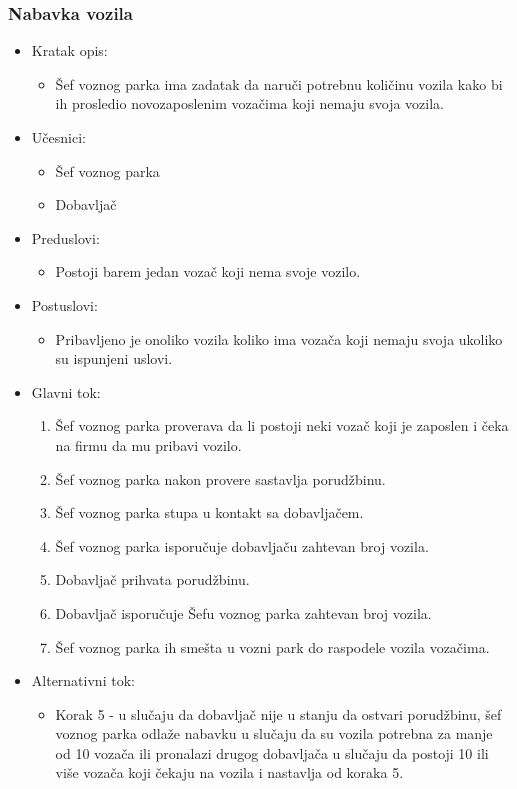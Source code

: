 \subsubsection{\bfseries Nabavka vozila}
\begin{itemize}
	\item Kratak opis:
		\begin{itemize}
			\item Šef voznog parka ima zadatak da naruči potrebnu količinu vozila kako bi ih prosledio novozaposlenim vozačima koji nemaju svoja vozila.
		\end{itemize}

	\item Učesnici:
		\begin{itemize}
		    \item Šef voznog parka
			\item Dobavljač
		\end{itemize}


	\item Preduslovi:
		\begin{itemize}
		    \item Postoji barem jedan vozač koji nema svoje vozilo.
		\end{itemize}


	\item Postuslovi:
		\begin{itemize}
			\item Pribavljeno je onoliko vozila koliko ima vozača koji nemaju svoja ukoliko su ispunjeni uslovi.
	\end{itemize}

	\item Glavni tok:
		\begin{enumerate}
		    \item Šef voznog parka proverava da li postoji neki vozač koji je zaposlen i čeka na firmu da mu pribavi vozilo.
		    \item Šef voznog parka nakon provere sastavlja porudžbinu.
		    \item Šef voznog parka stupa u kontakt sa dobavljačem.
			\item Šef voznog parka isporučuje dobavljaču zahtevan broj vozila.
			\item Dobavljač prihvata porudžbinu.
			\item Dobavljač isporučuje Šefu voznog parka zahtevan broj vozila.
			\item Šef voznog parka ih smešta u vozni park do raspodele vozila vozačima.
		\end{enumerate}

	\item Alternativni tok:
		\begin{itemize}
		    \item Korak 5 - u slučaju da dobavljač nije u stanju da ostvari porudžbinu, šef voznog parka odlaže nabavku u slučaju da su vozila potrebna za manje od 10 vozača ili pronalazi drugog dobavljača u slučaju da postoji 10 ili više vozača koji čekaju na vozila i nastavlja od koraka 5.
		\end{itemize}

\end{itemize}

